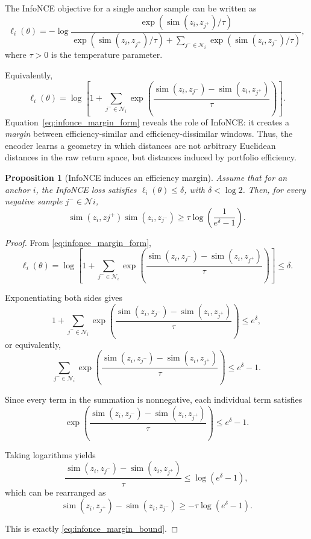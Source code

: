 \documentclass[preprint,12pt]{elsarticle}
\theoremstyle{plain}
\newtheorem{proposition}[theorem]{Proposition}
\theoremstyle{definition}
\begin{document}
The InfoNCE objective for a single anchor sample can be written as
\begin{equation}
	\ell_i(\theta)
	=
	-\log
	\frac{
		\exp\!\left(\operatorname{sim}(z_i,z_{j^+})/\tau\right)
	}{
		\exp\!\left(\operatorname{sim}(z_i,z_{j^+})/\tau\right)
		+
		\sum_{j^-\in\mathcal{N}_i}
		\exp\!\left(\operatorname{sim}(z_i,z_{j^-})/\tau\right)
	},
	\label{eq:single_infonce}
\end{equation}
where $\tau>0$ is the temperature parameter.

Equivalently,
\begin{equation}
	\ell_i(\theta)
	=
	\log
	\left[
	1+
	\sum_{j^-\in\mathcal{N}_i}
	\exp
	\left(
	\frac{
		\operatorname{sim}(z_i,z_{j^-})
		-
		\operatorname{sim}(z_i,z_{j^+})
	}{\tau}
	\right)
	\right].
	\label{eq:infonce_margin_form}
\end{equation}
Equation~\eqref{eq:infonce_margin_form} reveals the role of InfoNCE: it creates a \emph{margin} between efficiency-similar and efficiency-dissimilar windows. Thus, the encoder learns a geometry in which distances are not arbitrary Euclidean distances in the raw return space, but distances induced by portfolio efficiency.
\begin{proposition}[InfoNCE induces an efficiency margin]
	\label{prop:infonce_efficiency_margin}
	Assume that for an anchor $i$, the InfoNCE loss satisfies $\ell_i(\theta)\leq \delta$, with $\delta<\log 2$. Then, for every negative sample $j^-\in\mathcal{N}i$,
	\begin{equation}
		\operatorname{sim}(z_i,z{j^+})
		\operatorname{sim}(z_i,z_{j^-})
		\geq
		\tau\log\left(\frac{1}{e^\delta-1}\right).
		\label{eq:infonce_margin_bound}
	\end{equation}
\end{proposition}
\begin{proof}
	From \eqref{eq:infonce_margin_form},
	\[
	\ell_i(\theta)
	=
	\log
	\left[
	1+
	\sum_{j^-\in\mathcal{N}_i}
	\exp
	\left(
	\frac{
		\operatorname{sim}(z_i,z_{j^-})
		-
		\operatorname{sim}(z_i,z_{j^+})
	}{\tau}
	\right)
	\right]
	\le \delta.
	\]
	
	Exponentiating both sides gives
	\[
	1+
	\sum_{j^-\in\mathcal{N}_i}
	\exp
	\left(
	\frac{
		\operatorname{sim}(z_i,z_{j^-})
		-
		\operatorname{sim}(z_i,z_{j^+})
	}{\tau}
	\right)
	\le e^\delta,
	\]
	or equivalently,
	\[
	\sum_{j^-\in\mathcal{N}_i}
	\exp
	\left(
	\frac{
		\operatorname{sim}(z_i,z_{j^-})
		-
		\operatorname{sim}(z_i,z_{j^+})
	}{\tau}
	\right)
	\le e^\delta-1.
	\]
	
	Since every term in the summation is nonnegative, each individual term satisfies
	\[
	\exp
	\left(
	\frac{
		\operatorname{sim}(z_i,z_{j^-})
		-
		\operatorname{sim}(z_i,z_{j^+})
	}{\tau}
	\right)
	\le e^\delta-1.
	\]
	
	Taking logarithms yields
	\[
	\frac{
		\operatorname{sim}(z_i,z_{j^-})
		-
		\operatorname{sim}(z_i,z_{j^+})
	}{\tau}
	\le
	\log(e^\delta-1),
	\]
	which can be rearranged as
	\[
	\operatorname{sim}(z_i,z_{j^+})
	-
	\operatorname{sim}(z_i,z_{j^-})
	\ge
	-\tau\log(e^\delta-1).
	\]
	
	This is exactly \eqref{eq:infonce_margin_bound}.
\end{proof}
\end{document}

